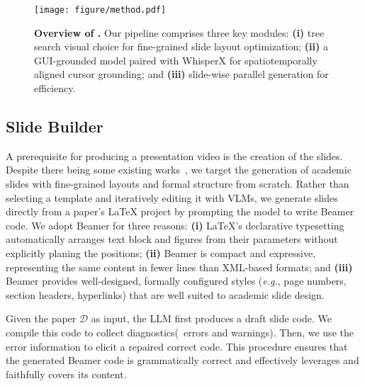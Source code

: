 \vspace{-0.4\baselineskip} 
\begin{figure}[t]
    \centering
    \texttt{[image: figure/method.pdf]}
    \caption{\textbf{Overview of {\agent}.} Our pipeline comprises three key modules: \textbf{(i)} tree search visual choice for fine-grained slide layout optimization; \textbf{(ii)} a GUI-grounded model paired with WhisperX for spatiotemporally aligned cursor grounding; and \textbf{(iii)} slide-wise parallel generation for efficiency.}
    \label{fig:method}
\end{figure}

\subsection{Slide Builder}
\vspace{-0.4\baselineskip}
A prerequisite for producing a presentation video is the creation of the slides. Despite there being some existing works~\cite{zheng2025pptagent}, we target the generation of academic slides with fine-grained layouts and formal structure from scratch.
Rather than selecting a template and iteratively editing it with VLMs, we generate slides directly from a paper’s \LaTeX{} project by prompting the model to write Beamer code. We adopt Beamer for three reasons: \textbf{(i)} \LaTeX{}’s declarative typesetting automatically arranges text block and figures from their parameters without explicitly planing the positions; \textbf{(ii)} Beamer is compact and expressive, representing the same content in fewer lines than XML-based formats; and \textbf{(iii)} Beamer provides well-designed, formally configured styles (\textit{e.g.}, page numbers, section headers, hyperlinks) that are well suited to academic slide design.

Given the paper $\mathcal{D}$ as input, the LLM first produces a draft slide code. We compile this code to collect diagnostics(\ie~errors and warnings). Then, we use the error information to elicit a repaired correct code.
This procedure ensures that the generated Beamer code is grammatically correct and effectively leverages and faithfully covers its content.

